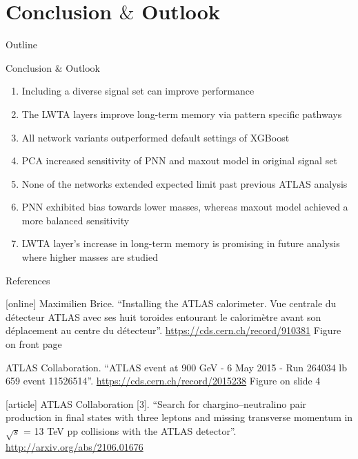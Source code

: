 \documentclass[UKenglish]{beamer}
\begin{document}
\section{Conclusion $\&$ Outlook}
\begin{frame}{Outline}
    \tableofcontents[currentsection]
\end{frame}
\begin{frame}{Conclusion $\&$ Outlook}
    \begin{enumerate}
        \item Including a diverse signal set can improve performance
        \item The LWTA layers improve long-term memory via pattern specific pathways
        \item All network variants outperformed default settings of XGBoost
        \item PCA increased sensitivity of PNN and maxout model in original signal set
        \item None of the networks extended expected limit past previous ATLAS analysis
        \item PNN exhibited bias towards lower masses, whereas maxout model achieved a more balanced 
              sensitivity
        \item LWTA layer's increase in long-term memory is promising in future analysis 
              where higher masses are studied 
    \end{enumerate}
\end{frame}





\begin{frame}{References}
    \begin{thebibliography}{}
        \footnotesize
        [online]
        Maximilien Brice.
        \newblock \enquote{Installing the ATLAS calorimeter. Vue centrale du
        détecteur ATLAS avec ses huit toroides entourant le
        calorimètre avant son déplacement au centre du
        détecteur}.
        \newblock \url{https://cds.cern.ch/record/910381}
        \newblock Figure on front page
        
        ATLAS Collaboration.
        \newblock \enquote{ATLAS event at 900 GeV - 6 May 2015 - Run 264034 lb 659
        event 11526514}.
        \newblock \url{https://cds.cern.ch/record/2015238}
        \newblock Figure on slide 4

        
        [article]
        ATLAS Collaboration [3].
        \newblock \enquote{Search for chargino--neutralino pair production in final states with three leptons and missing transverse momentum in {$\sqrt{s}$} = 13 {TeV} pp collisions with the {ATLAS} detector}.
        \newblock \url{http://arxiv.org/abs/2106.01676}



    \end{thebibliography}
\end{frame}
\end{document}
